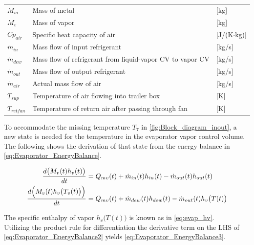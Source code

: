 \begin{center}
\begin{tabular}{l p{10cm} l}
		$M_{m}$          & Mass of metal                                                            & [\si{kg}]                         \\
		$M_{v}$          & Mass of vapor                                                            & [\si{kg}]                         \\
		$Cp_{air}$       & Specific heat capacity of air                                            & [\si{J}/(\si{K}$ \cdot $\si{kg})] \\
		$\dot{m}_{in} $  & Mass flow of input refrigerant                                           & [\si{kg}/\si{s}]                  \\
		$\dot{m}_{dew} $ & Mass flow of refrigerant from liquid-vapor CV to vapor CV                & [\si{kg}/\si{s}]                  \\
		$\dot{m}_{out} $ & Mass flow of output refrigerant                                          & [\si{kg}/\si{s}]                  \\
		$\dot{m}_{air}$  & Actual mass flow of air                                                  & [\si{kg}/\si{s}]                  \\
		$T_{sup} $       & Temperature of air flowing into trailer box                              & [\si{K}]                          \\
		$T_{retfan}$     & Temperature of return air after passing through fan                      & [\si{K}]
	\end{tabular}
\end{center}


To accommodate the missing temperature $ T_7 $ in \cref{fig:Block_diagram_inout}, a new state is needed for the temperature in the evaporator vapor control volume. The following shows the derivation of that state from the energy balance in \cref{eq:Evaporator_EnergyBalance}.

\begin{align}
	\frac{ d\bigl(M_{v}(t) h_v(t) \bigr)}{dt} & = Q_{mv}(t) + \dot{m}_{in}(t)h_{in}(t) - \dot{m}_{out}(t)h_{out}(t) 		\label{eq:Evaporator_EnergyBalance}\\
	\frac{ d\Bigl(M_{v}(t) h_v \bigl(T_v(t)\bigr) \Bigr)}{dt} & = Q_{mv}(t) + \dot{m}_{dew}(t)h_{dew}(t) - \dot{m}_{out}(t)h_v\bigl(T(t)\bigr)		\label{eq:Evaporator_EnergyBalance2}
\end{align}

The specific enthalpy of vapor $ h_v\bigl(T(t)\bigr) $ is known as in \cref{eq:evap_hv}. \\
Utilizing the product rule for differentiation the derivative term on the LHS of \cref{eq:Evaporator_EnergyBalance2} yields \cref{eq:Evaporator_EnergyBalance3}.


